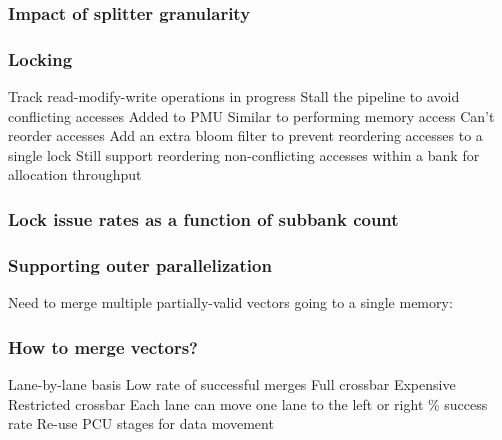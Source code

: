 \documentclass[aspectratio=169]{beamer}
\begin{document}
\begin{frame}
  \frametitle{Impact of splitter granularity}
  \hskip1.5in
\end{frame}
\begin{frame}
  \frametitle{Locking}
  \begin{outline}
    \1 Track read-modify-write operations in progress
    \1 Stall the pipeline to avoid conflicting accesses
    \pause
    \1 Added to PMU
    \2 Similar to performing memory access
    \pause
    \1 Can't reorder accesses
    \2 Add an extra bloom filter to prevent reordering accesses to a single lock
    \2 Still support reordering non-conflicting accesses within a bank for allocation throughput
  \end{outline}
\end{frame}
\begin{frame}
  \frametitle{Lock issue rates as a function of subbank count}
  \hskip1.5in
\end{frame}
\begin{frame}
  \frametitle{Supporting outer parallelization}
  Need to merge multiple partially-valid vectors going to a single memory:

  \centering
{
  \centering
}
\end{frame}
\begin{frame}
  \frametitle{How to merge vectors?}
  \begin{outline}
    \1 Lane-by-lane basis
    \2 Low rate of successful merges
    \pause
    \1 Full crossbar
    \2 Expensive
    \pause
    \1 Restricted crossbar
    \2 Each lane can move one lane to the left or right
    \% success rate
    \2 Re-use PCU stages for data movement
  \end{outline}
\end{frame}
\end{document}
